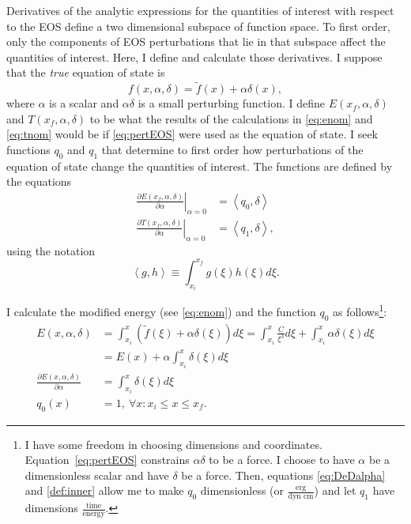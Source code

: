 \documentclass[]{article}
\newcommand{\nomf}{\tilde f} \newcommand{\COST}{\cal C}
\newcommand\inner[2]{\left<#1,#2\right>}
\newcommand\dum{\xi}
\newcommand\Ddum{d\dum}
\begin{document}
Derivatives of the analytic expressions for the quantities of interest
with respect to the EOS define a two dimensional subspace of
function space.  To first order, only the components of EOS
perturbations that lie in that subspace affect the quantities of
interest.  Here, I define and calculate those derivatives.  I suppose
that the \emph{true} equation of state is
\begin{equation}
  \label{eq:pertEOS}
  f(x,\alpha,\delta) = \nomf(x) + \alpha\delta(x),
\end{equation}
where $\alpha$ is a scalar and $\alpha\delta$ is a small perturbing
function.  I define $E(x_f,\alpha,\delta)$ and $T(x_f,\alpha,\delta)$
to be what the results of the calculations in \eqref{eq:enom} and
\eqref{eq:tnom} would be if \eqref{eq:pertEOS} were used as the
equation of state.  I seek functions $q_0$ and $q_1$ that determine
to first order how perturbations of the equation of state change the
quantities of interest.  The functions are defined by the equations
\begin{align}
  \label{eq:DeDalpha}
  \left. \frac{\partial E(x_f,\alpha,\delta)}{\partial
      \alpha}\right|_{\alpha=0}  &= \inner{q_0}{\delta} \\
  \label{eq:DtDalpha}
  \left. \frac{\partial T(x_f,\alpha,\delta)}{\partial \alpha}
  \right|_{\alpha=0} &= \inner{q_1}{\delta},
\end{align}
using the notation
\begin{equation}
  \label{def:inner}
  \inner{g}{h} \equiv \int_{x_i}^{x_f} g(\dum) h(\dum) \Ddum.
\end{equation}

I calculate the modified energy (see \eqref{eq:enom}) and the function
$q_0$ as follows\footnote{I have some freedom in choosing dimensions
  and coordinates.  Equation~\ref{eq:pertEOS} constrains $\alpha
  \delta$ to be a force.  I choose to have $\alpha$ be a dimensionless
  scalar and have $\delta$ be a force.  Then, equations
  \eqref{eq:DeDalpha} and \eqref{def:inner} allow me to make $q_0$
  dimensionless (or $\frac{\text{erg}}{\text{dyn cm}}$) and let
  $q_1$ have dimensions $\frac{\text{time}}{\text{energy}}$.}:
\begin{align}
  E(x,\alpha,\delta) &= \int_{x_i}^x \left( \nomf(\dum) + \alpha\delta(\dum)
    \right) \Ddum= \int_{x_i}^x \frac{C}{\dum^3}\Ddum + \int_{x_i}^x
    \alpha\delta(\dum) \Ddum \nonumber \\
  &= E(x) + \alpha \int_{x_i}^x \delta(\dum) \Ddum \nonumber \\
  \frac{\partial E(x,\alpha,\delta)}{\partial \alpha} &= \int_{x_i}^x
  \delta(\dum) \Ddum \nonumber \\
  \label{eq:q_0}
  q_0(x) &= 1,~\forall x: x_i \leq x \leq x_f.
\end{align}
\end{document}
